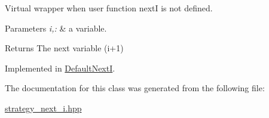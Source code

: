 \-Virtual wrapper when user function next\-I is not defined. 


\begin{DoxyParams}{\-Parameters}
{\em i,\-:} & a variable. \\
\hline
\end{DoxyParams}
\begin{DoxyReturn}{\-Returns}
\-The next variable (i+1) 
\end{DoxyReturn}


\-Implemented in \hyperlink{classDefaultNextI_aa44893d3fa6e8b167774ff85d798ec3b}{\-Default\-Next\-I}.



\-The documentation for this class was generated from the following file\-:\begin{DoxyCompactItemize}
\item 
\hyperlink{strategy__next__i_8hpp}{strategy\-\_\-next\-\_\-i.\-hpp}\end{DoxyCompactItemize}
